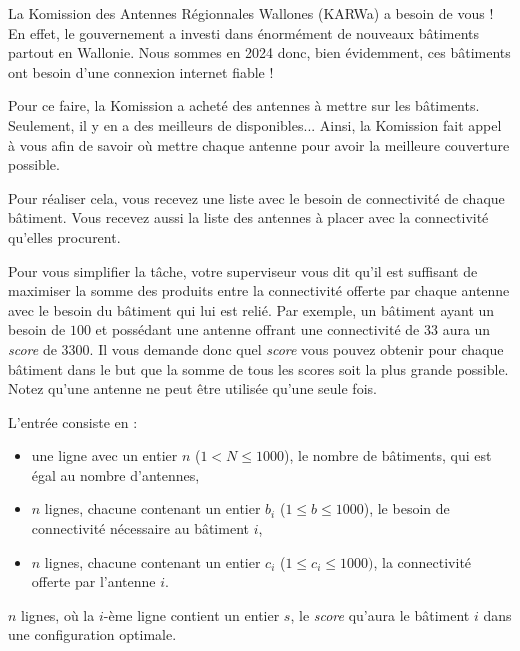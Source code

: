 \problemname{\problemyamlname}


La Komission des Antennes Régionnales Wallones (KARWa) a besoin de vous ! En effet, le gouvernement a investi dans énormément de nouveaux bâtiments partout en Wallonie. Nous sommes en 2024 donc, bien évidemment, ces bâtiments ont besoin d'une connexion internet fiable !

Pour ce faire, la Komission a acheté des antennes à mettre sur les bâtiments. Seulement, il y en a des meilleurs de disponibles... Ainsi, la Komission fait appel à vous afin de savoir où mettre chaque antenne pour avoir la meilleure couverture possible.

Pour réaliser cela, vous recevez une liste avec le besoin de connectivité de chaque bâtiment. Vous recevez aussi la liste des antennes à placer avec la connectivité qu'elles procurent.

Pour vous simplifier la tâche, votre superviseur vous dit qu'il est suffisant de maximiser la somme des produits entre la connectivité offerte par chaque antenne avec le besoin du bâtiment qui lui est relié. Par exemple, un bâtiment ayant un besoin de $100$ et possédant une antenne offrant une connectivité de $33$ aura un \emph{score} de $3300$. Il vous demande donc quel \emph{score} vous pouvez obtenir pour chaque bâtiment dans le but que la somme de tous les scores soit la plus grande possible. Notez qu'une antenne ne peut être utilisée qu'une seule fois.

\begin{Input}
    L'entrée consiste en :
    \begin{itemize}
      \item une ligne avec un entier $n$ ($1 < N \leq 1000$), le nombre de bâtiments, qui est égal au nombre d'antennes,
      \item $n$ lignes, chacune contenant un entier $b_i$ ($1 \leq b \leq 1000$), le besoin de connectivité nécessaire au bâtiment $i$,
      \item $n$ lignes, chacune contenant un entier $c_i$ ($1 \leq c_i \leq 1000)$, la connectivité offerte par l'antenne $i$.
    \end{itemize}
\end{Input}

\begin{Output}
  $n$ lignes, où la $i$-ème ligne contient un entier $s$, le \emph{score} qu'aura le bâtiment $i$ dans une configuration optimale.
\end{Output}
